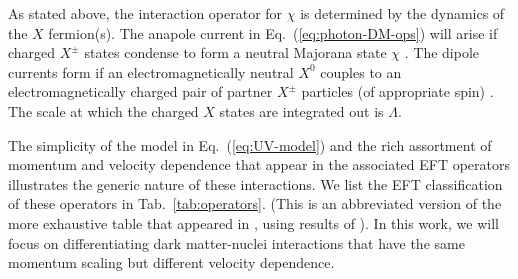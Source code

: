 \documentclass[11pt]{article}
\newcommand{\Eq}[1]{Eq.~(\ref{#1})} \newcommand{\Eqs}[2]{Eqs.~(\ref{#1}) and (\ref{#2})} \newcommand{\Eqm}[2]{Eqs.~(\ref{#1}) through (\ref{#2})}
\newcommand{\Tab}[1]{Tab.~\ref{#1}}
\begin{document}
As stated above, the interaction operator for $\chi$ is determined by the dynamics of the $X$ fermion(s). The anapole current in \Eq{eq:photon-DM-ops} will arise if charged $X^\pm$ states condense to form a neutral Majorana state $\chi$ \cite{Bagnasco:1993st}. The dipole currents form if an electromagnetically neutral $X^0$ couples to an electromagnetically charged pair of partner $X^\pm$ particles (of appropriate spin) \cite{Weiner:2012gm}. The scale at which the charged $X$ states are integrated out is $\Lambda$.

The simplicity of the model in \Eq{eq:UV-model} and the rich assortment of momentum and velocity dependence that appear in the associated EFT operators illustrates the generic nature of these interactions. We list the EFT classification of these operators in \Tab{tab:operators}. (This is an abbreviated version of the more exhaustive table that appeared in \cite{Gluscevic:2015sqa}, using results of \cite{Gresham:2014vja, Gluscevic:2015sqa}). In this work, we will focus on differentiating dark matter-nuclei interactions that have the same momentum scaling but different velocity dependence.
\end{document}
